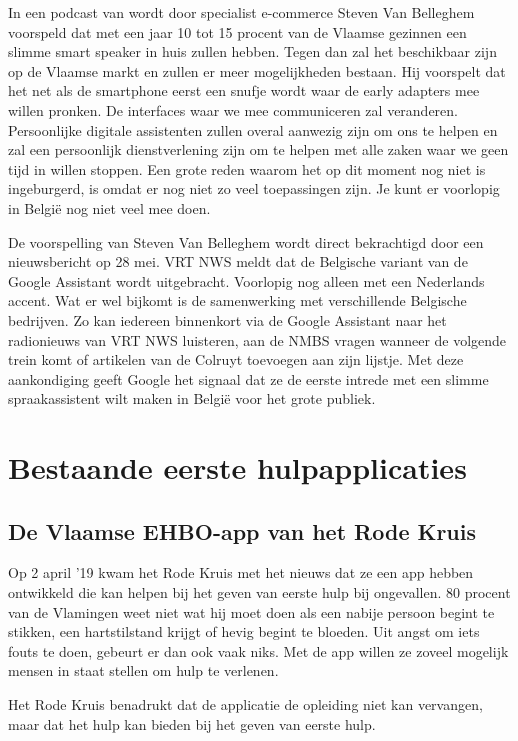In een podcast van \autocite{Belghmidi2019a} wordt door specialist e-commerce Steven Van Belleghem voorspeld dat met een jaar 10 tot 15 procent van de Vlaamse gezinnen een slimme smart speaker in huis zullen hebben. Tegen dan zal het beschikbaar zijn op de Vlaamse markt en zullen er meer mogelijkheden bestaan. Hij voorspelt dat het net als de smartphone eerst een snufje wordt waar de early adapters mee willen pronken. De interfaces waar we mee communiceren zal veranderen. Persoonlijke digitale assistenten zullen overal aanwezig zijn om ons te helpen en zal een persoonlijk dienstverlening zijn om te helpen met alle zaken waar we geen tijd in willen stoppen.
Een grote reden waarom het op dit moment nog niet is ingeburgerd, is omdat er nog niet zo veel toepassingen zijn. Je kunt er voorlopig in België nog niet veel mee doen.

De voorspelling van Steven Van Belleghem wordt direct bekrachtigd door een nieuwsbericht op 28 mei. VRT NWS meldt dat de Belgische variant van de Google Assistant wordt uitgebracht. \autocite{Belghmidi2019} Voorlopig nog alleen met een Nederlands accent. Wat er wel bijkomt is de samenwerking met verschillende Belgische bedrijven. Zo kan iedereen binnenkort via de Google Assistant naar het radionieuws van VRT NWS luisteren, aan de NMBS vragen wanneer de volgende trein komt of artikelen van de Colruyt toevoegen aan zijn lijstje. Met deze aankondiging geeft Google het signaal dat ze de eerste intrede met een slimme spraakassistent wilt maken in België voor het grote publiek.

\section{Bestaande eerste hulpapplicaties}
\subsection{De Vlaamse EHBO-app van het Rode Kruis}
\label{ss:de vlaamse ehbo-app van het rode kruis}
Op 2 april ’19 kwam het Rode Kruis met het nieuws dat ze een app hebben ontwikkeld die kan helpen bij het geven van eerste hulp bij ongevallen. 80 procent van de Vlamingen weet niet wat hij moet doen als een nabije persoon begint te stikken, een hartstilstand krijgt of hevig begint te bloeden. Uit angst om iets fouts te doen, gebeurt er dan ook vaak niks. Met de app willen ze zoveel mogelijk mensen in staat stellen om hulp te verlenen. \autocite{Decroubele2019}

Het Rode Kruis benadrukt dat de applicatie de opleiding niet kan vervangen, maar dat het hulp kan bieden bij het geven van eerste hulp.

